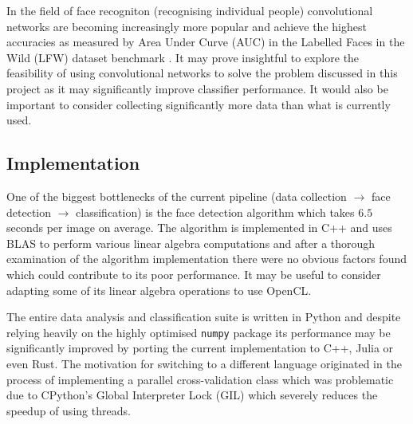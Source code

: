 In the field of face recogniton (recognising individual people) convolutional
networks are becoming increasingly more popular and achieve the highest
accuracies as measured by Area Under Curve (AUC) in the Labelled Faces in the
Wild (LFW) dataset benchmark \citep{LFWTechUpdate}. It may prove insightful to
explore the feasibility of using convolutional networks to solve the problem
discussed in this project as it may significantly improve classifier
performance. It would also be important to consider collecting significantly
more data than what is currently used.

\subsection{Implementation}
One of the biggest bottlenecks of the current pipeline (data collection
$\rightarrow$ face detection $\rightarrow$ classification) is the face detection
algorithm which takes $6.5$ seconds per image on average. The algorithm is
implemented in C++ and uses BLAS to perform various linear algebra computations
and after a thorough examination of the algorithm implementation there were no
obvious factors found which could contribute to its poor performance. It may be
useful to consider adapting some of its linear algebra operations to use
OpenCL.

The entire data analysis and classification suite is written in Python and
despite relying heavily on the highly optimised \texttt{numpy} package its
performance may be significantly improved by porting the current implementation
to C++, Julia or even Rust. The motivation for switching to a different
language originated in the process of implementing a parallel cross-validation
class which was problematic due to CPython's Global Interpreter Lock (GIL)
which severely reduces the speedup of using threads. 


